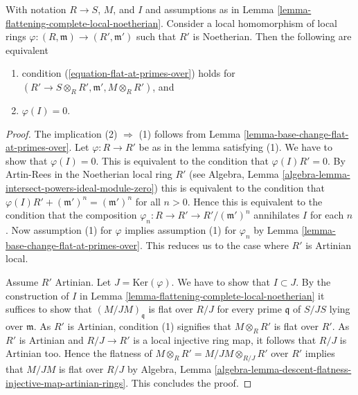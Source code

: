 \begin{lemma}
\label{lemma-flattening-complete-local-noetherian-property-by-finite-type}
With notation $R \to S$, $M$, and $I$ and assumptions as in
Lemma \ref{lemma-flattening-complete-local-noetherian}.
Consider a local homomorphism of local rings
$\varphi : (R, \mathfrak m) \to (R', \mathfrak m')$
such that $R'$ is Noetherian. Then the following are equivalent
\begin{enumerate}
\item condition (\ref{equation-flat-at-primes-over}) holds
for $(R' \to S \otimes_R R', \mathfrak m', M \otimes_R R')$, and
\item $\varphi(I) = 0$.
\end{enumerate}
\end{lemma}

\begin{proof}
The implication (2) $\Rightarrow$ (1) follows from
Lemma \ref{lemma-base-change-flat-at-primes-over}.
Let $\varphi : R \to R'$ be as in the lemma satisfying (1).
We have to show that $\varphi(I) = 0$.
This is equivalent to the condition that $\varphi(I)R' = 0$.
By Artin-Rees in the Noetherian local ring $R'$ (see
Algebra, Lemma \ref{algebra-lemma-intersect-powers-ideal-module-zero})
this is equivalent to the condition that
$\varphi(I)R' + (\mathfrak m')^n = (\mathfrak m')^n$ for all $n > 0$.
Hence this is equivalent to the condition that the composition
$\varphi_n : R \to R' \to R'/(\mathfrak m')^n$ annihilates $I$ for each $n$.
Now assumption (1) for $\varphi$ implies assumption (1) for
$\varphi_n$ by
Lemma \ref{lemma-base-change-flat-at-primes-over}.
This reduces us to the case where $R'$ is Artinian local.

\medskip\noindent
Assume $R'$ Artinian. Let $J = \text{Ker}(\varphi)$. We have to show that
$I \subset J$. By the construction of $I$ in
Lemma \ref{lemma-flattening-complete-local-noetherian}
it suffices to show that $(M/JM)_{\mathfrak q}$ is flat over $R/J$
for every prime $\mathfrak q$ of $S/JS$ lying over $\mathfrak m$.
As $R'$ is Artinian, condition (1) signifies that $M \otimes_R R'$
is flat over $R'$. As $R'$ is Artinian and $R/J \to R'$ is a local
injective ring map, it follows that $R/J$ is Artinian
too. Hence the flatness of $M \otimes_R R' = M/JM \otimes_{R/J} R'$ over
$R'$ implies that $M/JM$ is flat over $R/J$ by
Algebra,
Lemma \ref{algebra-lemma-descent-flatness-injective-map-artinian-rings}.
This concludes the proof.
\end{proof}

